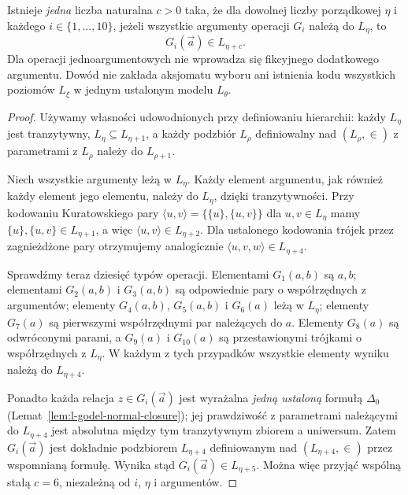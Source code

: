\begin{lemat}
\label{lem:l-godel-finite-stage-bound-77}
Istnieje \emph{jedna} liczba naturalna $c>0$ taka,
że dla dowolnej liczby porządkowej $\eta$ i każdego
$i\in\{1,\ldots,10\}$, jeżeli wszystkie argumenty
operacji $G_i$ należą do $L_\eta$, to
\[
G_i(\vec a)\in L_{\eta+c}.
\]
Dla operacji jednoargumentowych nie wprowadza się
fikcyjnego dodatkowego argumentu. Dowód nie zakłada
aksjomatu wyboru ani istnienia kodu wszystkich poziomów
$L_\xi$ w jednym ustalonym modelu $L_\theta$.
\end{lemat}
\begin{proof}
Używamy własności udowodnionych przy definiowaniu
hierarchii: każdy $L_\eta$ jest tranzytywny,
$L_\eta\subseteq L_{\eta+1}$, a każdy podzbiór
$L_\rho$ definiowalny nad $(L_\rho,\in)$
z parametrami z $L_\rho$ należy do $L_{\rho+1}$.

Niech wszystkie argumenty leżą w $L_\eta$.
Każdy element argumentu, jak również każdy element
jego elementu, należy do $L_\eta$, dzięki
tranzytywności. Przy kodowaniu Kuratowskiego pary
$\langle u,v\rangle=\{\{u\},\{u,v\}\}$
dla $u,v\in L_\eta$ mamy
$\{u\},\{u,v\}\in L_{\eta+1}$, a więc
$\langle u,v\rangle\in L_{\eta+2}$.
Dla ustalonego kodowania trójek przez zagnieżdżone
pary otrzymujemy analogicznie
$\langle u,v,w\rangle\in L_{\eta+4}$.

Sprawdźmy teraz dziesięć typów operacji.
Elementami $G_1(a,b)$ są $a,b$;
elementami $G_2(a,b)$ i $G_3(a,b)$ są odpowiednie
pary o współrzędnych z argumentów;
elementy $G_4(a,b)$, $G_5(a,b)$ i $G_6(a)$
leżą w $L_\eta$; elementy $G_7(a)$ są
pierwszymi współrzędnymi par należących do $a$.
Elementy $G_8(a)$ są odwróconymi parami, a
$G_9(a)$ i $G_{10}(a)$ są przestawionymi
trójkami o współrzędnych z $L_\eta$.
W każdym z tych przypadków wszystkie elementy
wyniku należą do $L_{\eta+4}$.

Ponadto każda relacja $z\in G_i(\vec a)$ jest
wyrażalna \emph{jedną ustaloną} formułą $\Delta_0$
(Lemat~\ref{lem:l-godel-normal-closure}); jej
prawdziwość z parametrami należącymi do
$L_{\eta+4}$ jest absolutna między tym
tranzytywnym zbiorem a uniwersum.
Zatem $G_i(\vec a)$ jest dokładnie podzbiorem
$L_{\eta+4}$ definiowanym nad
$(L_{\eta+4},\in)$ przez wspomnianą formułę.
Wynika stąd
$G_i(\vec a)\in L_{\eta+5}$.
Można więc przyjąć wspólną stałą $c=6$,
niezależną od $i$, $\eta$ i argumentów.
\end{proof}

